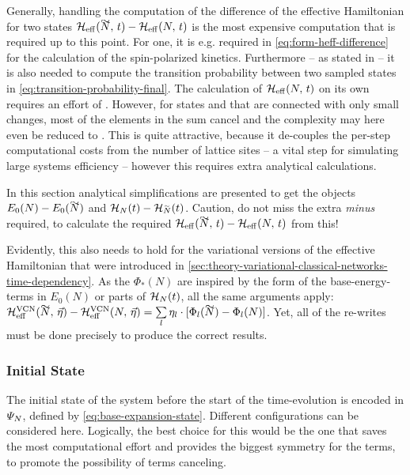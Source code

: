 Generally, handling the computation of the difference of the effective Hamiltonian for two states $\HeffOft[\vphantom{N}\smash{\tilde{N}}]-\HeffOft[N]$ is the most expensive computation that is required up to this point.
For one, it is e.g. required in \autoref{eq:form-heff-difference} for the calculation of the spin-polarized kinetics.
Furthermore -- as stated in  -- it is also needed to compute the transition probability between two sampled states in \autoref{eq:transition-probability-final}.
The calculation of $\HeffOft[N]$ on its own requires an effort of .
However, for states \ketN[N] and  that are connected with only small changes, most of the elements in the sum cancel and the complexity may here even be reduced to .
This is quite attractive, because it de-couples the per-step computational costs from the number of lattice sites -- a vital step for simulating large systems efficiency -- however this requires extra analytical calculations.

In this section analytical simplifications are presented to get the objects $E_0(N)-E_0(\vphantom{N}\smash{\tilde{N}})$ and $\HNOft - \HNOft[\vphantom{N}\smash{\tilde{N}}]$. 
Caution, do not miss the extra \emph{minus} required, to calculate the required $\HeffOft[\vphantom{N}\smash{\tilde{N}}]-\HeffOft[N]$ from this!

Evidently, this also needs to hold for the variational versions of the effective Hamiltonian that were introduced in \autoref{sec:theory-variational-classical-networks-time-dependency}.
As the $\Phi_\ast(N)$ are inspired by the form of the base-energy-terms in $E_0(N)$ or parts of $\HNOft$, all the same arguments apply: 
$\Heffvcn{\vphantom{N}\smash{\tilde{N}}}{\vec{\eta}} - \Heffvcn{N}{\vec{\eta}} = \lsum[l] \eta_l \cdot \left[\Phi_l(\vphantom{N}\smash{\tilde{N}}) - \Phi_l(N)\right]$.
Yet, all of the re-writes must be done precisely to produce the correct results.

\subsubsection*{Initial State}

The initial state of the system before the start of the time-evolution is encoded in $\psiN$, defined by \autoref{eq:base-expansion-state}. Different configurations can be considered here.
Logically, the best choice for this would be the one that saves the most computational effort and provides the biggest symmetry for the terms, to promote the possibility of terms canceling.

